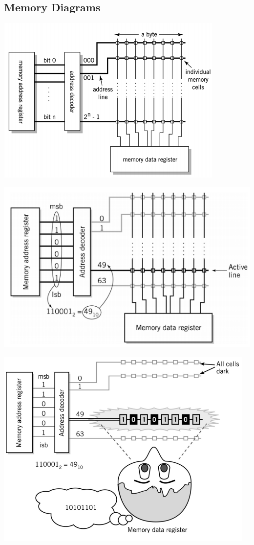 \documentclass{article}[18pt]
\begin{document}
\subsection{Memory Diagrams}
\begin{center}
	\includegraphics[scale=0.7]{memory_diagram}
\end{center}
\begin{center}
	\includegraphics[scale=0.7]{memory_diagram1}
\end{center}
\begin{center}
	\includegraphics[scale=0.7]{memory_diagram2}
\end{center}
\end{document}
